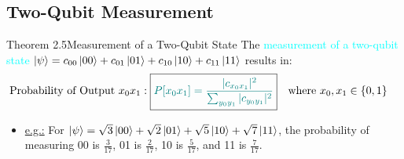 \documentclass{book}
\begin{document}
\subsection{Two-Qubit Measurement}
\begin{thmBox}{Theorem 2.5}{Measurement of a Two-Qubit State}
    The \textcolor{cyan}{measurement of a two-qubit state} \textcolor{brown}{\(\ket{\psi} = c_{00}\ket{00} + c_{01}\ket{01} + c_{10}\ket{10} + c_{11}\ket{11}\)} results in:
    \begin{align*}
        & \text{Probability of Output } x_0x_1: \boxed{\textcolor{teal}{P[x_0x_1] = \frac{|c_{x_0x_1}|^2}{\sum_{y_0y_1} |c_{y_0y_1}|^2}}} \quad \text{where } x_0, x_1 \in \{0, 1\}
    \end{align*}
\end{thmBox}
\begin{itemize}
    \item \uline{e.g.:} For \(\ket{\psi} = \sqrt{3} \ket{00} + \sqrt{2} \ket{01} + \sqrt{5} \ket{10} + \sqrt{7} \ket{11}\), the probability of measuring 00 is \(\frac{3}{17}\), 01 is \(\frac{2}{17}\), 10 is \(\frac{5}{17}\), and 11 is \(\frac{7}{17}\).
\end{itemize}
\newpage
\end{document}
